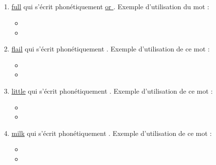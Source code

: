 \subsection{}\label{sec:chelou}

\begin{enumerate}
\item \href{http://www.wordreference.com/enfr/full}{full} qui s'écrit phonétiquement \href{https://home.cc.umanitoba.ca/\~krussll/phonetics/narrower/dark-l.html}{ or }. Exemple
d'utilisation du mot :

\begin{itemize}
\item{}
\item{}
\end{itemize}
  
\item \href{http://www.wordreference.com/enfr/flail}{flail} qui s'écrit phonétiquement \href{https://home.cc.umanitoba.ca/\~krussll/phonetics/narrower/dark-l.html}{}. Exemple d'utilisation de
  ce mot :
  
  \begin{itemize}
  \item{}
  \item{}
  \end{itemize}

\item \href{http://www.wordreference.com/enfr/little}{little} qui s'écrit phonétiquement \href{https://home.cc.umanitoba.ca/\~krussll/phonetics/narrower/dark-l.html}{}. Exemple d'utilisation
de ce mot :

\begin{itemize}
\item{}
\item{}
\end{itemize}

\item \href{http://www.wordreference.com/enfr/milk}{milk} qui s'écrit phonétiquement \href{https://home.cc.umanitoba.ca/\~krussll/phonetics/narrower/dark-l.html}{}. Exemple d'utilisation de ce
  mot :
  
  \begin{itemize}
  \item{}
  \item{}
  \end{itemize}

  
\end{enumerate}